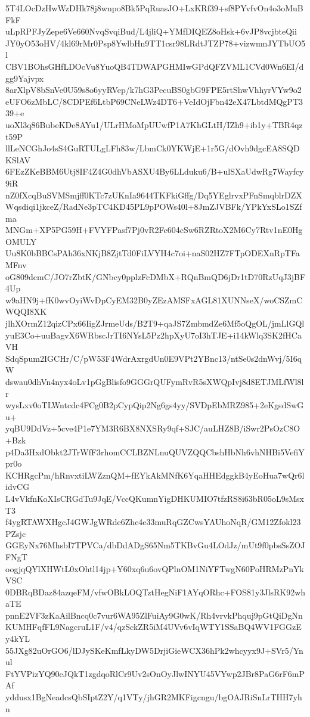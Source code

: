 5T4LOcDzHwWzDHk78j8wnpo8Bk5PqRuasJO+LxKRf39+sf8PYvfvOn4o3oMuBFkF
uLpRPFJyZepe6Ve660NvqSvqiBud/L4jliQ+YMfDIQEZ8oHsk+6vJP8vcjbteQii
JY0yO53oHV/4kl69rMr0Psp8YwlbHn9TT1csr98LRdtJTZP78+vizwmnJYTbUO5l
CBV1BOhsGHfLDOcVu8YuoQB4TDWAPGHMIwGPdQFZVML1CVd0Wn6EI/dgg9Yajvpx
8arXlpV8bSnVe0U59s8o6yyRVep/k7hG3PecuBS0gbG9FPE5rtShwVhhyrVYw9o2
eUFO6zMbLC/8CDPEf6LtbP69CNeLWz4DT6+VeIdOjFbn42eX47LbtdMQgPT339+e
uoXl3q86BubeKDe8AYu1/ULrHMoMpUUwfP1A7KhGLtH/IZh9+ib1y+TBR4qzt59P
llLeNCGhJo4sS4GuRTULgLFh83w/LbmCk0YKWjE+1r5G/dOvh9dgcEA8SQDKSlAV
6FEzZKeBBM6Utj8IF4Z4G0dhVbASXU4By6LLduku6/B+ulSXaUdwRg7Wayfcy9iR
nZ0fXcqBuSVMSmjff0KTc7zUKnIa9644TKFkiGffg/Dq5YEglrvxPFnSmqblrDZX
Wqsdiqi1jkceZ/RadNe3pTC4KD45PL9pPOWs40l+8JmZJVBFk/YPkYxSLo1SZfma
MNGm+XP5PG59H+FVYFPasf7Pj0vR2Fc604cSw6RZRtoX2M6Cy7Rtv1nE0HgOMULY
Uu8K0bBBCsPAh36xNKjB8ZjtTd0FiLVYH4c7oi+naS02HZ7FTpODEXnRpTFaMFnv
oG809dcmC/JO7rZbtK/GNbcy0pplzFcDMbX+RQnBmQD6jDr1tD70RzUqJ3jBF4Up
w9aHN9j+fK0wvOyiWvDpCyEM32B0yZEzAMSFxAGL81XUNNseX/woCSZmCWQQI8XK
jlhXOrmZ12qizCPx66IigZJrmeUds/B2T9+qaJS7ZmbmdZe6Mf5oQgOL/jmLlGQl
yuE3Co+uuBagvX6WRbscJrTI6NYsL5Pz2hpXyU7oI3hTJE+i14kWlq3SK2fHCaVH
SdqSpum2IGCHr/C/pW53F4WdrAxrgdUn0E9VPt2YBnc13/ntSe0s2dnWvj/5I6qW
dswau0dhVn4nyx4oLv1pGgBlisfo9GGGrQUFymRvR5sXWQpIvj8d8ETJMLfWl8lr
wysLxv0oTLWntcdc4FCg0B2pCypQip2Ng6gs4yy/SVDpEbMRZ985+2eKgsdSwGu+
yqBU9DdVz+5cve4P1e7YM3R6BX8NXSRy9qf+SJC/auLHZ8B/iSwr2PsOzC8O+Bzk
p4Da3HxdObkt2JTrWfF3rhomCCLBZNLnuQUVZQQCbshHbNh6vhNHBi5VefiYpr0o
KCHRgcPm/hRnvxtiLWZznQM+fEYkAkMNfK6YqaHHEdggkB4yEoHua7wQr6lidvCG
L4vVkfnKoXIsCRGdTu9JqE/VccQKumnYigDHKUMIO7tfzRS8i63bR05oL9sMsxT3
f4ygRTAWXHgcJ4GWJgWRde6Zhc4e33muRqGZCwsYAUhoNqR/GM12Zfokl23PZsjc
GGEyNx76MhsbI7TPVCa/dbDdADgS65Nm5TKBvGu4LOdJz/mUt9f0pbsSsZOJFNgT
oogjqQYlXHWtL0xOhtl14jp+Y60xq6u6ovQPlnOM1NiYFTwgN60PoHRMzPnYkVSC
0DBRqBDaz84azqeFM/vfwOBkLOQTztHegNiF1AYqORhc+FOS81y3JlsRK92whaTE
pnnE2VF3zKaAilBncq0c7vur6WA95ZlFuiAy9G0wK/Rh4vrvkPhquj9pGtQiDgNn
KUMHFqfFL9NagcruL1F/v4/qzSckZR5iM4UVv6vIqWTY1SSaBQ4WV1FGGzEy4kYL
55JXg82uOrGO6/lDJySKeKmfLkyDW5DrjiGieWCX36hPk2whcyyx9J+SVr5/Ynul
FtYVPizYQ90eJQkT1zgdqoRlCr9Uv2sOnOyJlwINYU45VYwp2JBr8PaG6rF6mPAf
yddusx1BgNeadcsQbSIptZ2Y/q1VTy/jhGR2MKFigcngu/bgOAJRiSnLrTHH7yhn
